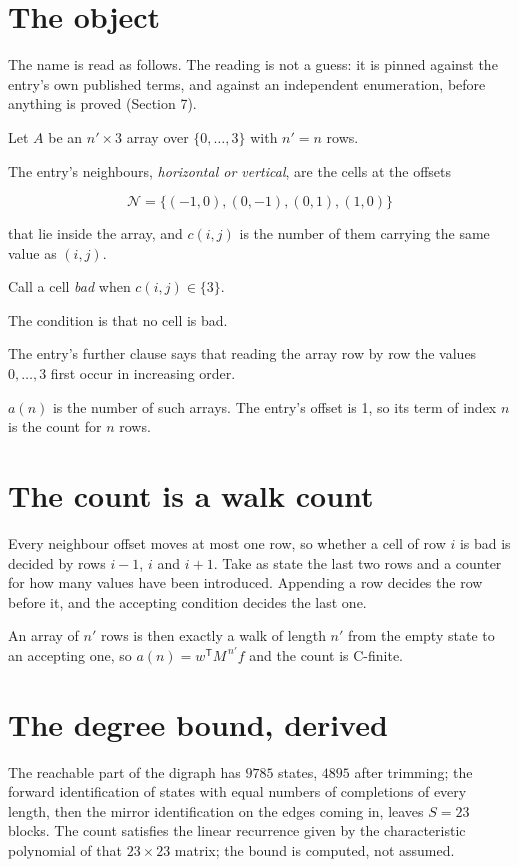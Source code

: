 \documentclass[11pt]{article}
\theoremstyle{definition}
\begin{document}
\section{The object}

The name is read as follows. The reading is not a guess: it is pinned against the entry's own published terms, and against an independent enumeration, before anything is proved (Section 7).

Let $A$ be an $n' \times 3$ array over $\{0,\dots,3\}$ with $n' = n$ rows.

The entry's neighbours, {\itshape horizontal or vertical}, are the cells at the offsets

\[\mathcal{N} = \{(-1,0), (0,-1), (0,1), (1,0)\}\]

that lie inside the array, and $c(i,j)$ is the number of them carrying the same value as $(i,j)$.

Call a cell {\itshape bad} when $c(i,j) \in \{3\}$.

The condition is that no cell is bad.

The entry's further clause says that reading the array row by row the values $0,\dots,3$ first occur in increasing order.

$a(n)$ is the number of such arrays. The entry's offset is 1, so its term of index $n$ is the count for $n$ rows.

\section{The count is a walk count}

Every neighbour offset moves at most one row, so whether a cell of row $i$ is bad is decided by rows $i-1$, $i$ and $i+1$. Take as state the last two rows and a counter for how many values have been introduced. Appending a row decides the row before it, and the accepting condition decides the last one.

An array of $n'$ rows is then exactly a walk of length $n'$ from the empty state to an accepting one, so $a(n) = w^{\mathsf T}M^{\,n'}f$ and the count is C-finite.

\section{The degree bound, derived}

The reachable part of the digraph has $9785$ states, $4895$ after trimming; the forward identification of states with equal numbers of completions of every length, then the mirror identification on the edges coming in, leaves $S = 23$ blocks. The count satisfies the linear recurrence given by the characteristic polynomial of that $23\times23$ matrix; the bound is computed, not assumed.
\end{document}
